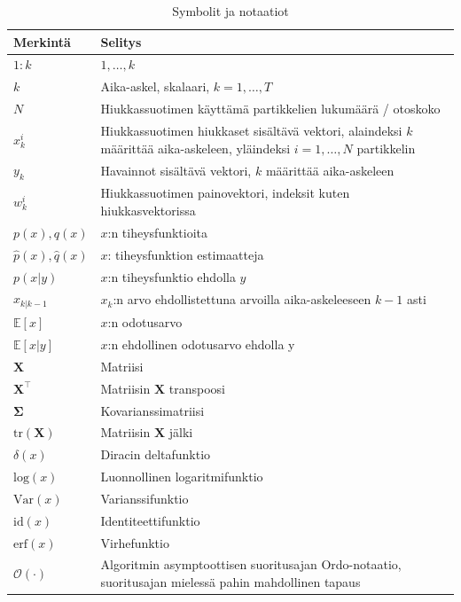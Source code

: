 \documentclass[
  12pt,
  a4paper, twoside]{book}
\begin{document}
\begin{table}

\caption{\label{tab:notaatiot}Symbolit ja notaatiot}
\centering
\begin{tabular}[t]{ll}
\toprule
Merkintä & Selitys\\
\midrule
$1:k$ & $1,\ldots,k$\\
$k$ & Aika-askel, skalaari, $k={1,\ldots,T}$\\
$N$ & Hiukkassuotimen käyttämä partikkelien lukumäärä / otoskoko\\
$x^i_k$ & \makecell[l]{Hiukkassuotimen hiukkaset sisältävä vektori,\\alaindeksi $k$ määrittää aika-askeleen,\\yläindeksi $i={1,\ldots,N}$ partikkelin}\\
$y_k$ & Havainnot sisältävä vektori, $k$ määrittää aika-askeleen\\
\addlinespace
$w^i_k$ & Hiukkassuotimen painovektori, indeksit kuten hiukkasvektorissa\\
$p(x), q(x)$ & $x$:n tiheysfunktioita\\
$\hat{p}(x), \hat{q}(x)$ & $x$: tiheysfunktion estimaatteja\\
$p(x|y)$ & $x$:n tiheysfunktio ehdolla $y$\\
$x_{k|k-1}$ & $x_k$:n arvo ehdollistettuna arvoilla aika-askeleeseen $k-1$ asti\\
\addlinespace
$\mathbb{E}[x]$ & $x$:n odotusarvo\\
$\mathbb{E}[x|y]$ & $x$:n ehdollinen odotusarvo ehdolla y\\
$\mathbf{X}$ & Matriisi\\
$\mathbf{X}^\top$ & Matriisin $\mathbf{X}$ transpoosi\\
$\mathbf{\Sigma}$ & Kovarianssimatriisi\\
\addlinespace
$\text{tr}(\mathbf{X})$ & Matriisin $\mathbf{X}$ jälki\\
$\delta(x)$ & Diracin deltafunktio\\
$\text{log}(x)$ & Luonnollinen logaritmifunktio\\
$\text{Var}(x)$ & Varianssifunktio\\
$\text{id}(x)$ & Identiteettifunktio\\
\addlinespace
$\text{erf}(x)$ & Virhefunktio\\
$\mathcal{O}(\cdot)$ & \makecell[l]{Algoritmin asymptoottisen suoritusajan Ordo-notaatio,\\suoritusajan mielessä pahin mahdollinen tapaus}\\

\end{tabular}
\end{table}
\end{document}
